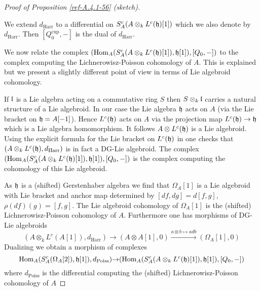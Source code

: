 \documentclass{amsart}
\numberwithin{equation}{section}
\theoremstyle{definition}
\theoremstyle{remark}
\begin{document}
\begin{proof}[Proof of Proposition \ref{ref-A.4.1-56} (sketch)]
\begin{enumerate}
We extend $d_{\operatorname{Harr}}$ to a differential on $S^c_A(A\otimes_k L^c(\frak{h})[1])$
which we also denote by $d_{\operatorname{Harr}}$. Then $[Q^{\operatorname{cup}}_0,-]$ is the
dual of $d_{\operatorname{Harr}}$. 
\end{enumerate}
We now relate the complex $({\operatorname {Hom}}_A(S^c_A(A\otimes_k
L^c(\frak{h})[1]),\frak{h}[1]),[Q_0,-])$ to the complex computing the
Lichnerowisz-Poisson cohomology of $A$. This is explained
\cite[\S1.4.9]{Fresse} but we present a slightly different point of
view in terms of Lie algebroid cohomology.

If $\frak{l}$ is a Lie algebra acting on a commutative ring $S$ then
$S\otimes_k \frak{l}$ carries a natural structure of a Lie algebroid.
In our case the Lie algebra $\frak{h}$ acts on $A$ (via the Lie
bracket on $\frak{h}=A[-1]$). Hence $L^c(\frak{h})$ acts on $A$ via
the projection map $L^c(\frak{h})\rightarrow \frak{h}$ which is a Lie algebra
homomorphism. It follows $A\otimes L^c(\frak{h})$ is a Lie algebroid.
Using the explicit formula for the Lie bracket on $L^c(\frak{h})$ in
\cite[\S3.1]{Fresse} one checks that $(A\otimes_k
L^c(\frak{h}),d_{\text{Harr}})$ is in fact a DG-Lie algebroid. The
complex $({\operatorname {Hom}}_A(S^c_A(A\otimes_k
L^c(\frak{h})[1]),\frak{h}[1]),[Q_0,-])$ is the complex computing
the cohomology of this Lie algebroid. 

As $\frak{h}$ is a (shifted) Gerstenhaber algebra we find that
$\Omega_{A}[1]$ is a Lie algebroid with Lie bracket and anchor map
determined by $[df,dg]=d[f,g]$, $\rho(df)(g)=[f,g]$. The Lie algebroid
cohomology of $\Omega_A[1]$ is the (shifted) Lichnerowisz-Poisson
cohomology of $A$. 
Furthermore one has  morphisms of DG-Lie algebroids
\begin{equation}
\label{ref-A.12-59}
(A\otimes_k L^c(A[1]),d_{\text{Harr}})\rightarrow (A\otimes A[1],0)\xrightarrow{a\otimes b\mapsto adb} 
(\Omega_A[1],0)
\end{equation}
Dualizing we obtain a morphism of complexes
\begin{equation}
\label{ref-A.13-60}
{\operatorname {Hom}}_A(S^c_A(\Omega_A[2]),\frak{h}[1]),d_{\text{Poiss}})
{\rightarrow}
({\operatorname {Hom}}_A(S^c_A(A\otimes_k L^c(\frak{h})[1]),\frak{h}[1]),[Q_0,-])
\end{equation}
where $d_{\operatorname{Poiss}}$ is the differential computing the (shifted) Lichnerowisz-Poisson
cohomology of $A$ 


\end{proof}
\end{document}
